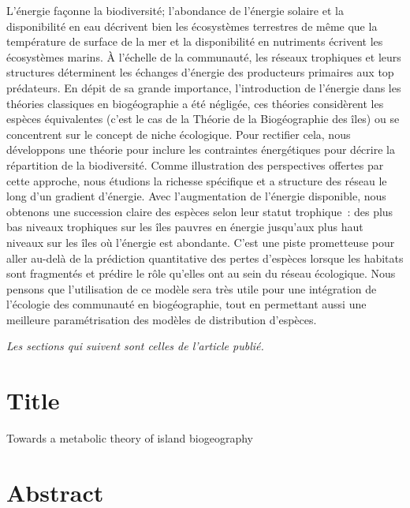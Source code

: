 L’énergie façonne la biodiversité; l’abondance de l’énergie solaire et la
disponibilité en eau décrivent bien les écosystèmes terrestres de même que la
température de surface de la mer et la disponibilité en nutriments écrivent les
écosystèmes marins. À l'échelle de la communauté, les réseaux trophiques et
leurs structures déterminent les échanges d'énergie des producteurs primaires
aux top prédateurs. En dépit de sa grande importance, l'introduction de
l'énergie dans les théories classiques en biogéographie a été négligée, ces
théories considèrent les espèces équivalentes (c'est le cas de la Théorie de la
Biogéographie des îles) ou se concentrent sur le concept de niche
écologique. Pour rectifier cela, nous développons une théorie pour inclure
les contraintes énergétiques pour décrire la répartition de la biodiversité.
Comme illustration des perspectives offertes par cette approche, nous étudions
la richesse spécifique et a structure des réseau le long d'un gradient
d'énergie. Avec l'augmentation de l'énergie disponible, nous obtenons une succession claire
des espèces selon leur statut trophique~: des plus bas niveaux trophiques sur
les îles pauvres en énergie jusqu'aux plus haut niveaux sur les îles où l'énergie
est abondante. C'est une piste prometteuse pour aller au-delà de la prédiction quantitative
des pertes d’espèces lorsque les habitats sont fragmentés et prédire le rôle qu'elles
ont au sein du réseau écologique. Nous pensons que l'utilisation de ce modèle
sera très utile pour une intégration de l'écologie des communauté en biogéographie,
tout en permettant aussi une meilleure paramétrisation des modèles de distribution
d'espèces.




\emph{Les sections qui suivent sont celles de l'article publié.}
\section{Title}\label{title}

Towards a metabolic theory of island biogeography

\section{Abstract}\label{abstract}

